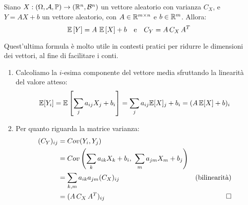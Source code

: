 \medskip
\begin{teob}[\JPTh{12.5}]
  Siano $X: \DoCo$ un vettore aleatorio con varianza $C_X$, e
  $Y = AX+b$ un vettore aleatorio, con $A \in \mathbb R^{m \times n}$ e $b \in \mathbb R^m$. Allora:
  $$ \mathbb E \left[ Y \right] = A \ \mathbb E \left[ X \right] + b \quad \text{e} \quad C_Y = A \, C_X \, A^T$$
\end{teob}
Quest'ultima formula è molto utile in contesti pratici per ridurre le dimensioni dei vettori, al fine di facilitare i conti.
\begin{dimo}\Fixvmode
	\begin{enumerate}
	\item Calcoliamo la $i$-esima componente del vettore media sfruttando la linearità del valore atteso:
	$$\mathbb E[Y_i] = \mathbb E\left[ \sum_j a_{ij} X_j + b_i \right] = \sum_j a_{ij} \mathbb E[X]_j + b_i = (A \, \mathbb E[X] + b)_i$$
	\item Per quanto riguarda la matrice varianza:
	\begin{align*}
		(C_Y)_{ij} &=Cov(Y_i,Y_j) \\
		&=Cov \left(\sum_k a_{ik} X_k + b_i, \ \sum_m a_{jm} X_m +b_j \right) \\
		&=\sum_{k,m} a_{ik} a_{jm} (C_X)_{ij} &\text{(bilinearità)} \\
		&= (A \, C_X \, A^T)_{ij} & \qedhere
	\end{align*}
	\end{enumerate}
\end{dimo}

\cleardoublepage
